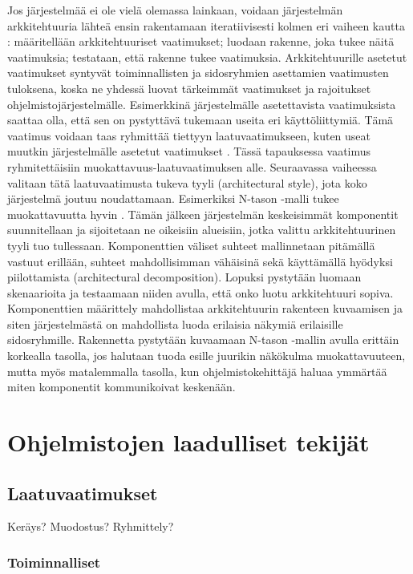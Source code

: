 \documentclass[finnish]{tktltiki2}
\theoremstyle{definition}
\theoremstyle{remark}
\begin{document}
Jos järjestelmää ei ole vielä olemassa lainkaan, voidaan järjestelmän arkkitehtuuria lähteä ensin rakentamaan iteratiivisesti kolmen eri vaiheen kautta \citep[s. 97-115]{gorton_understanding_2011}: määritellään arkkitehtuuriset vaatimukset; luodaan rakenne, joka tukee näitä vaatimuksia; testataan, että rakenne tukee vaatimuksia. Arkkitehtuurille asetetut vaatimukset syntyvät toiminnallisten ja sidosryhmien asettamien vaatimusten tuloksena, koska ne yhdessä luovat tärkeimmät vaatimukset ja rajoitukset ohjelmistojärjestelmälle. Esimerkkinä järjestelmälle asetettavista vaatimuksista saattaa olla, että sen on pystyttävä tukemaan useita eri käyttöliittymiä. Tämä vaatimus voidaan taas ryhmittää tiettyyn laatuvaatimukseen, kuten useat muutkin järjestelmälle asetetut vaatimukset \citep[s. 117]{Ran:1998:ASV:288408.288438}. Tässä tapauksessa vaatimus ryhmitettäisiin muokattavuus-laatuvaatimuksen alle. Seuraavassa vaiheessa valitaan tätä laatuvaatimusta tukeva tyyli (architectural style), jota koko järjestelmä joutuu noudattamaan. Esimerkiksi N-tason -malli tukee muokattavuutta hyvin \citep[s. 103]{gorton_understanding_2011}. Tämän jälkeen järjestelmän keskeisimmät komponentit suunnitellaan ja sijoitetaan ne oikeisiin alueisiin, jotka valittu arkkitehtuurinen tyyli tuo tullessaan. Komponenttien väliset suhteet mallinnetaan pitämällä vastuut erillään, suhteet mahdollisimman vähäisinä sekä käyttämällä hyödyksi piilottamista (architectural decomposition). Lopuksi pystytään luomaan skenaarioita ja testaamaan niiden avulla, että onko luotu arkkitehtuuri sopiva. Komponenttien määrittely mahdollistaa arkkitehtuurin rakenteen kuvaamisen ja siten järjestelmästä on mahdollista luoda erilaisia näkymiä erilaisille sidosryhmille. Rakennetta pystytään kuvaamaan N-tason -mallin avulla erittäin korkealla tasolla, jos halutaan tuoda esille juurikin näkökulma muokattavuuteen, mutta myös matalemmalla tasolla, kun ohjelmistokehittäjä haluaa ymmärtää miten komponentit kommunikoivat keskenään.

\section{Ohjelmistojen laadulliset tekijät}


\subsection{Laatuvaatimukset}
Keräys? Muodostus? Ryhmittely?
\subsubsection{Toiminnalliset}
\end{document}
